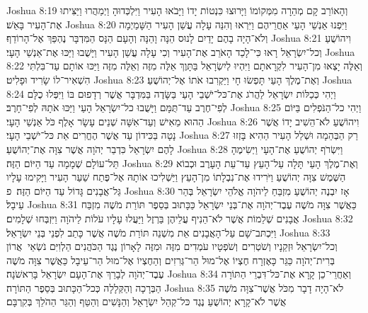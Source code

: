Joshua 8:19	וְהָאוֹרֵב קָם מְהֵרָה מִמְּקוֹמוֹ וַיָּרוּצוּ כִּנְטוֹת יָדוֹ וַיָּבֹאוּ הָעִיר וַיִּלְכְּדוּהָ וַיְמַהֲרוּ וַיַּצִּיתוּ אֶת־הָעִיר בָּאֵשׁ׃
Joshua 8:20	וַיִּפְנוּ אַנְשֵׁי הָעַי אַחֲרֵיהֶם וַיִּרְאוּ וְהִנֵּה עָלָה עֲשַׁן הָעִיר הַשָּׁמַיְמָה וְלֹא־הָיָה בָהֶם יָדַיִם לָנוּס הֵנָּה וָהֵנָּה וְהָעָם הַנָּס הַמִּדְבָּר נֶהְפַּךְ אֶל־הָרוֹדֵף׃
Joshua 8:21	וִיהוֹשֻׁעַ וְכל־יִשְׂרָאֵל רָאוּ כִּי־לָכַד הָאֹרֵב אֶת־הָעִיר וְכִי עָלָה עֲשַׁן הָעִיר וַיָּשֻׁבוּ וַיַּכּוּ אֶת־אַנְשֵׁי הָעָי׃
Joshua 8:22	וְאֵלֶּה יָצְאוּ מִן־הָעִיר לִקְרָאתָם וַיִּהְיוּ לְיִשְׂרָאֵל בַּתָּוֶךְ אֵלֶּה מִזֶּה וְאֵלֶּה מִזֶּה וַיַּכּוּ אוֹתָם עַד־בִּלְתִּי הִשְׁאִיר־לוֹ שָׂרִיד וּפָלִיט׃
Joshua 8:23	וְאֶת־מֶלֶךְ הָעַי תָּפְשׂוּ חָי וַיַּקְרִבוּ אֹתוֹ אֶל־יְהוֹשֻׁעַ׃
Joshua 8:24	וַיְהִי כְּכַלּוֹת יִשְׂרָאֵל לַהֲרֹג אֶת־כּל־יֹשְׁבֵי הָעַי בַּשָּׂדֶה בַּמִּדְבָּר אֲשֶׁר רְדָפוּם בּוֹ וַיִּפְּלוּ כֻלָּם לְפִי־חֶרֶב עַד־תֻּמָּם וַיָּשֻׁבוּ כל־יִשְׂרָאֵל הָעַי וַיַּכּוּ אֹתָהּ לְפִי־חָרֶב׃
Joshua 8:25	וַיְהִי כל־הַנֹּפְלִים בַּיּוֹם הַהוּא מֵאִישׁ וְעַד־אִשָּׁה שְׁנֵים עָשָׂר אָלֶף כֹּל אַנְשֵׁי הָעָי׃
Joshua 8:26	וִיהוֹשֻׁעַ לֹא־הֵשִׁיב יָדוֹ אֲשֶׁר נָטָה בַּכִּידוֹן עַד אֲשֶׁר הֶחֱרִים אֵת כּל־יֹשְׁבֵי הָעָי׃
Joshua 8:27	רַק הַבְּהֵמָה וּשְׁלַל הָעִיר הַהִיא בָּזְזוּ לָהֶם יִשְׂרָאֵל כִּדְבַר יְהֹוָה אֲשֶׁר צִוָּה אֶת־יְהוֹשֻׁעַ׃
Joshua 8:28	וַיִּשְׂרֹף יְהוֹשֻׁעַ אֶת־הָעָי וַיְשִׂימֶהָ תֵּל־עוֹלָם שְׁמָמָה עַד הַיּוֹם הַזֶּה׃
Joshua 8:29	וְאֶת־מֶלֶךְ הָעַי תָּלָה עַל־הָעֵץ עַד־עֵת הָעָרֶב וּכְבוֹא הַשֶּׁמֶשׁ צִוָּה יְהוֹשֻׁעַ וַיֹּרִידוּ אֶת־נִבְלָתוֹ מִן־הָעֵץ וַיַּשְׁלִיכוּ אוֹתָהּ אֶל־פֶּתַח שַׁעַר הָעִיר וַיָּקִימוּ עָלָיו גַּל־אֲבָנִים גָּדוֹל עַד הַיּוֹם הַזֶּה׃ {פ}
Joshua 8:30	אָז יִבְנֶה יְהוֹשֻׁעַ מִזְבֵּחַ לַיהֹוָה אֱלֹהֵי יִשְׂרָאֵל בְּהַר עֵיבָל׃
Joshua 8:31	כַּאֲשֶׁר צִוָּה מֹשֶׁה עֶבֶד־יְהֹוָה אֶת־בְּנֵי יִשְׂרָאֵל כַּכָּתוּב בְּסֵפֶר תּוֹרַת מֹשֶׁה מִזְבַּח אֲבָנִים שְׁלֵמוֹת אֲשֶׁר לֹא־הֵנִיף עֲלֵיהֶן בַּרְזֶל וַיַּעֲלוּ עָלָיו עֹלוֹת לַיהֹוָה וַיִּזְבְּחוּ שְׁלָמִים׃
Joshua 8:32	וַיִּכְתּב־שָׁם עַל־הָאֲבָנִים אֵת מִשְׁנֵה תּוֹרַת מֹשֶׁה אֲשֶׁר כָּתַב לִפְנֵי בְּנֵי יִשְׂרָאֵל׃
Joshua 8:33	וְכל־יִשְׂרָאֵל וּזְקֵנָיו וְשֹׁטְרִים  וְשֹׁפְטָיו עֹמְדִים מִזֶּה  וּמִזֶּה  לָאָרוֹן נֶגֶד הַכֹּהֲנִים הַלְוִיִּם נֹשְׂאֵי  אֲרוֹן בְּרִית־יְהֹוָה כַּגֵּר כָּאֶזְרָח חֶצְיוֹ אֶל־מוּל הַר־גְּרִזִים וְהַחֶצְיוֹ אֶל־מוּל הַר־עֵיבָל כַּאֲשֶׁר צִוָּה מֹשֶׁה עֶבֶד־יְהֹוָה לְבָרֵךְ אֶת־הָעָם יִשְׂרָאֵל בָּרִאשֹׁנָה׃
Joshua 8:34	וְאַחֲרֵי־כֵן קָרָא אֶת־כּל־דִּבְרֵי הַתּוֹרָה הַבְּרָכָה וְהַקְּלָלָה כְּכל־הַכָּתוּב בְּסֵפֶר הַתּוֹרָה׃
Joshua 8:35	לֹא־הָיָה דָבָר מִכֹּל אֲשֶׁר־צִוָּה מֹשֶׁה אֲשֶׁר לֹא־קָרָא יְהוֹשֻׁעַ נֶגֶד כּל־קְהַל יִשְׂרָאֵל וְהַנָּשִׁים וְהַטַּף וְהַגֵּר הַהֹלֵךְ בְּקִרְבָּם׃
